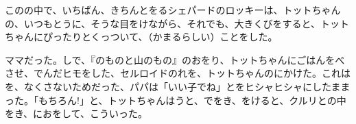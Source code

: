 このの中で、いちばん、きちんとをるシェパードのロッキーは、トットちゃんの、いつもとうに、そうな目をけながら、それでも、大きくびをすると、トットちゃんにぴったりとくっついて、（かまるらしい）ことをした。

ママだった。しで、『のものと山のもの』のおをり、トットちゃんにごはんをべさせ、でんだヒモをした、セルロイドのれを、トットちゃんのにかけた。これはを、なくさないためだった、パパは「いい子でね」とをヒシャヒシャにしたままった。「もちろん!」と、トットちゃんはうと、でをき、をけると、クルリとの中をき、におをして、こういった。


